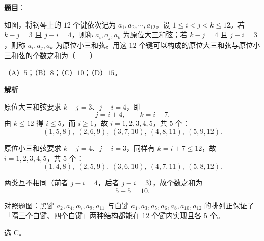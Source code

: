 \begin{answer}

\textbf{题目}：

如图，将钢琴上的 $12$ 个键依次记为 $a_1,a_2,\cdots,a_{12}$。设 $1\leqslant i<j<k\leqslant12$。若 $k-j=3$ 且 $j-i=4$，则称 $a_i,a_j,a_k$ 为原位大三和弦；若 $k-j=4$ 且 $j-i=3$，则称 $a_i,a_j,a_k$ 为原位小三和弦。用这 $12$ 个键可以构成的原位大三和弦与原位小三和弦的个数之和为\mbox{（　　）}

（A）$5$；（B）$8$；（C）$10$；（D）$15$。
\nopagebreak[4]
\begin{center}\end{center}
\nopagebreak[4]
\textbf{解析}

原位大三和弦要求 $k-j=3$、$j-i=4$，即
\nopagebreak[4]
\[j=i+4,\qquad k=i+7 .\]
由 $k\leqslant12$ 得 $i\leqslant5$，而 $i\geqslant1$，故 $i=1,2,3,4,5$，共 $5$ 个：
\nopagebreak[4]
\[(1,5,8),\ (2,6,9),\ (3,7,10),\ (4,8,11),\ (5,9,12).\]

原位小三和弦要求 $k-j=4$、$j-i=3$，同样有 $k=i+7\leqslant12$，故 $i=1,2,3,4,5$，共 $5$ 个：
\nopagebreak[4]
\[(1,4,8),\ (2,5,9),\ (3,6,10),\ (4,7,11),\ (5,8,12).\]

两类互不相同（前者 $j-i=4$，后者 $j-i=3$），故个数之和为
\nopagebreak[4]
\[5+5=10 .\]

对照题图：黑键 $a_2,a_4,a_7,a_9,a_{11}$ 与白键 $a_1,a_3,a_5,a_6,a_8,a_{10},a_{12}$ 的排列正保证了「隔三个白键、四个白键」两种结构都能在 $12$ 个键内实现且各 $5$ 个。

选 C。


\end{answer}
